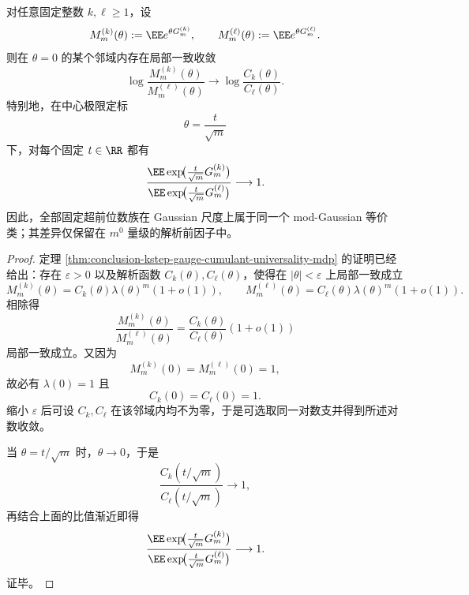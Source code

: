 \begin{theorem}\label{thm:conclusion-kstep-gauge-modgaussian-congruence}
对任意固定整数 \(k,\ell\ge 1\)，设
\[
M_m^{(k)}(\theta):=\EE e^{\theta G_m^{(k)}},
\qquad
M_m^{(\ell)}(\theta):=\EE e^{\theta G_m^{(\ell)}}.
\]
则在 \(\theta=0\) 的某个邻域内存在局部一致收敛
\[
\log\frac{M_m^{(k)}(\theta)}{M_m^{(\ell)}(\theta)}
\longrightarrow
\log\frac{C_k(\theta)}{C_\ell(\theta)}.
\]
特别地，在中心极限定标
\[
\theta=\frac{t}{\sqrt m}
\]
下，对每个固定 \(t\in\RR\) 都有
\[
\frac{\EE\exp\!\bigl(\frac{t}{\sqrt m}G_m^{(k)}\bigr)}
{\EE\exp\!\bigl(\frac{t}{\sqrt m}G_m^{(\ell)}\bigr)}
\longrightarrow 1.
\]
因此，全部固定超前位数族在 Gaussian 尺度上属于同一个 mod-Gaussian 等价类；其差异仅保留在 \(m^0\) 量级的解析前因子中。
\end{theorem}
\begin{proof}
定理 \ref{thm:conclusion-kstep-gauge-cumulant-universality-mdp} 的证明已经给出：存在 \(\varepsilon>0\) 以及解析函数 \(C_k(\theta),C_\ell(\theta)\)，使得在 \(|\theta|<\varepsilon\) 上局部一致成立
\[
M_m^{(k)}(\theta)=C_k(\theta)\lambda(\theta)^m(1+o(1)),
\qquad
M_m^{(\ell)}(\theta)=C_\ell(\theta)\lambda(\theta)^m(1+o(1)).
\]
相除得
\[
\frac{M_m^{(k)}(\theta)}{M_m^{(\ell)}(\theta)}
=
\frac{C_k(\theta)}{C_\ell(\theta)}(1+o(1))
\]
局部一致成立。又因为
\[
M_m^{(k)}(0)=M_m^{(\ell)}(0)=1,
\]
故必有 \(\lambda(0)=1\) 且
\[
C_k(0)=C_\ell(0)=1.
\]
缩小 \(\varepsilon\) 后可设 \(C_k,C_\ell\) 在该邻域内均不为零，于是可选取同一对数支并得到所述对数收敛。

当 \(\theta=t/\sqrt m\) 时，\(\theta\to 0\)，于是
\[
\frac{C_k(t/\sqrt m)}{C_\ell(t/\sqrt m)}\longrightarrow 1,
\]
再结合上面的比值渐近即得
\[
\frac{\EE\exp\!\bigl(\frac{t}{\sqrt m}G_m^{(k)}\bigr)}
{\EE\exp\!\bigl(\frac{t}{\sqrt m}G_m^{(\ell)}\bigr)}
\longrightarrow 1.
\]
证毕。
\end{proof}


